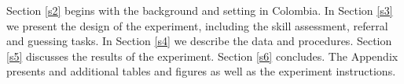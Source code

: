 \documentclass[11pt,a4paper,oneside]{article}
\begin{document}
Section \ref{s2} begins with the background and setting in Colombia. In Section \ref{s3} we present the design of the experiment, including the skill assessment, referral and guessing tasks. In Section \ref{s4} we describe the data and procedures. Section \ref{s5} discusses the results of the experiment. Section \ref{s6} concludes. The Appendix presents and additional tables and figures as well as the experiment instructions.








\end{document}
